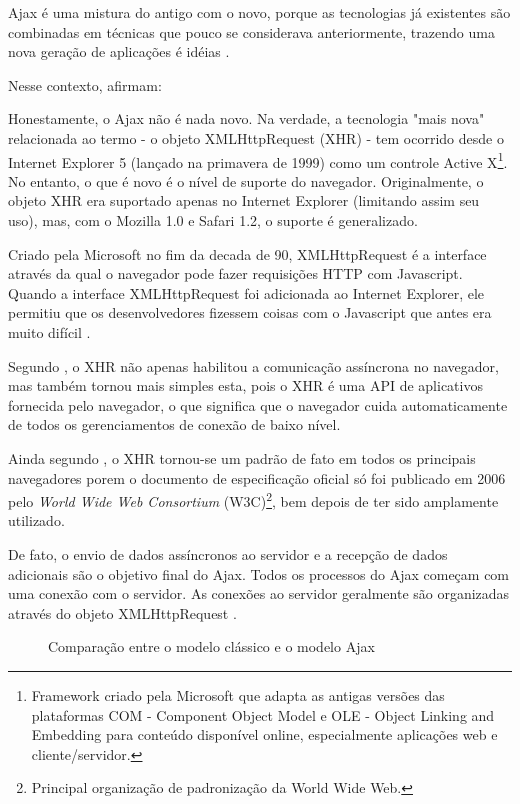 Ajax é uma mistura do antigo com o novo, porque as tecnologias já existentes são combinadas em técnicas que pouco se considerava anteriormente, trazendo uma nova geração de aplicações é idéias \cite{gross2006introduction}.

Nesse contexto,  afirmam:
\begin{citacao}
	Honestamente, o Ajax não é nada novo. Na verdade, a tecnologia "mais nova" relacionada ao termo - o objeto XMLHttpRequest (XHR) - tem ocorrido desde o Internet Explorer 5 (lançado na primavera de 1999) como um controle Active X\footnote{Framework criado pela Microsoft que adapta as antigas versões das plataformas COM - Component Object Model e OLE - Object Linking and Embedding para conteúdo disponível online, especialmente aplicações web e cliente/servidor.}. No entanto, o que é novo é o nível de suporte do navegador. Originalmente, o objeto XHR era suportado apenas no Internet Explorer (limitando assim seu uso), mas, com o Mozilla 1.0 e Safari 1.2, o suporte é generalizado.
\end{citacao}

Criado pela Microsoft no fim da decada de 90, XMLHttpRequest é a interface através da qual o navegador pode fazer requisições HTTP com Javascript. Quando a interface XMLHttpRequest foi adicionada ao Internet Explorer, ele permitiu que os desenvolvedores fizessem coisas com o Javascript que antes era muito difícil \cite{haverbeke2014eloquent}.

Segundo , o XHR não apenas habilitou a comunicação assíncrona no navegador, mas também tornou mais simples esta, pois o XHR é uma API de aplicativos fornecida pelo navegador, o que significa que o navegador cuida automaticamente de todos os gerenciamentos de conexão de baixo nível.

Ainda segundo , o XHR tornou-se um padrão de fato em todos os principais navegadores porem o documento de especificação oficial só foi publicado em 2006 pelo \emph{World Wide Web Consortium} (W3C)\footnote{Principal organização de padronização da World Wide Web.}, bem depois de ter sido amplamente utilizado.

De fato, o envio de dados assíncronos ao servidor e a recepção de dados adicionais são o objetivo final do Ajax. Todos os processos do Ajax começam com uma conexão com o servidor. As conexões ao servidor geralmente são organizadas através do objeto XMLHttpRequest \cite{resig2007pro}.

\begin{figure}[!htb]
	\centering
	\hfill
	\caption{Comparação entre o modelo clássico e o modelo Ajax}
	\label{defaultVsAjax}
\end{figure}

